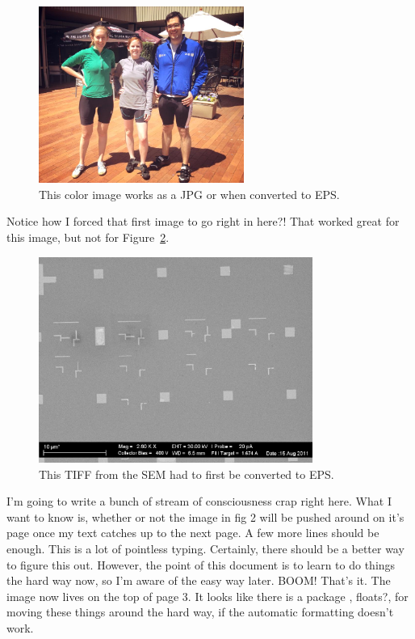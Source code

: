 \documentclass{article} %
\begin{document}
\begin{figure}[h] %
\centering %
\includegraphics[width = 0.6\textwidth]{tour_training.jpg}
\caption{This color image works as a JPG or when converted to EPS.}
\label{fig:tour}
\end{figure}

Notice how I forced that first image to go right in here?! That worked great for this image, but not for Figure~\ref{fig:sem}.

\begin{figure}
\centering
\includegraphics[width = 0.8\textwidth]{testimage.eps}
\caption{This TIFF from the SEM had to first be converted to EPS.}
\label{fig:sem}
\end{figure}

I'm going to write a bunch of stream of consciousness crap right here. What I want to know is, whether or not the image in fig 2 will be pushed around on it's page once my text catches up to the next page. A few more lines should be enough. This is a lot of pointless typing. Certainly, there should be a better way to figure this out. However, the point of this document is to learn to do things the hard way now, so I'm aware of the easy way later. BOOM! That's it. The image now lives on the top of page 3. It looks like there is a package , floats?, for moving these things around the hard way, if the automatic formatting doesn't work.
\end{document}
